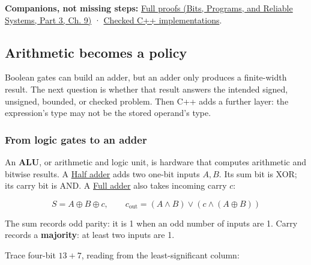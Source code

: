 \textbf{Companions, not missing steps:} \href{../01-Bits-Programs-and-Reliable-Systems-P03/main.pdf\#nameddest=01-foundations-i-ch011-m001---positional-value-masks-fields-and-de-morgan}{Full proofs (Bits, Programs, and Reliable Systems, Part 3, Ch. 9)} · \hyperref[appendix-4e2236f53445-m001---width-safe-fields-and-lsb-first-bit-packing]{Checked C++ implementations}.

\subsection{Arithmetic becomes a policy}\label{01-foundations-i-ch001-arithmetic-becomes-a-policy}

\hypertarget{01-foundations-i-ch001-arithmetic-becomes-a-policy}{}

Boolean gates can build an adder, but an adder only produces a finite-width result. The next question is whether that result answers the intended signed, unsigned, bounded, or checked problem. Then C++ adds a further layer: the expression's type may not be the stored operand's type.

\subsubsection{From logic gates to an adder}\label{01-foundations-i-ch001-from-logic-gates-to-an-adder}

\hypertarget{01-foundations-i-ch001-from-logic-gates-to-an-adder}{}

An \textbf{ALU}, or arithmetic and logic unit, is hardware that computes arithmetic and bitwise results. A \hyperref[appendix-1652d27a8e90]{Half adder} adds two one-bit inputs \(A,B\). Its sum bit is XOR; its carry bit is AND. A \hyperref[appendix-d1a5b1e520c2]{Full adder} also takes incoming carry \(c\):

\[
S=A\oplus B\oplus c,\qquad
c_{\mathrm{out}}=(A\land B)\lor(c\land(A\oplus B))
\]

The sum records odd parity: it is 1 when an odd number of inputs are 1. Carry records a \textbf{majority}: at least two inputs are 1.

Trace four-bit \(13+7\), reading from the least-significant column:

